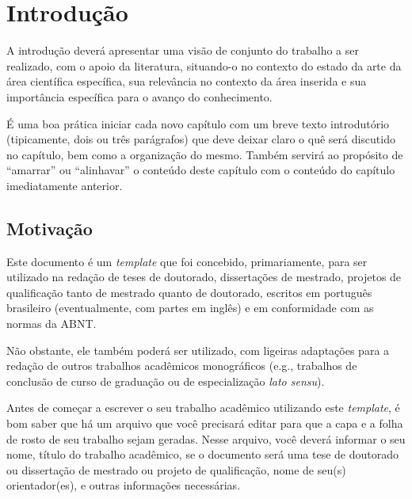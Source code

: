 
\chapter{Introdução}
\label{chap_introducao}


A introdução deverá apresentar uma visão de conjunto do trabalho a ser realizado, com o apoio da literatura, situando-o no contexto do estado da arte da área científica específica, sua relevância no contexto da área inserida e sua importância específica para o avanço do conhecimento.

É uma boa prática iniciar cada novo capítulo com um breve texto introdutório (tipicamente, dois ou três parágrafos) que deve deixar claro o quê será discutido no capítulo, bem como a organização do mesmo.
Também servirá ao propósito de ``amarrar'' ou ``alinhavar'' o conteúdo deste capítulo com o conteúdo do capítulo imediatamente anterior.

\section{Motivação}
\label{sec_motivacao}

Este documento é um \emph{template} que foi concebido, primariamente, para ser utilizado na redação de teses de doutorado, dissertações de mestrado, projetos de qualificação tanto de mestrado quanto de doutorado, escritos em português brasileiro (eventualmente, com partes em inglês) e em conformidade com as normas da ABNT.

Não obstante, ele também poderá ser utilizado, com ligeiras adaptações para a redação de outros trabalhos acadêmicos monográficos (e.g., trabalhos de conclusão de curso de graduação ou de especialização \emph{lato sensu}).

Antes de começar a escrever o seu trabalho acadêmico utilizando este \emph{template}, é bom saber que há um arquivo que você precisará editar para que a capa e a folha de rosto de seu trabalho sejam geradas.
Nesse arquivo, você deverá informar o seu nome, título do trabalho acadêmico, se o documento será uma tese de doutorado ou dissertação de mestrado ou projeto de qualificação, nome de seu(s) orientador(es), e outras informações necessárias.

